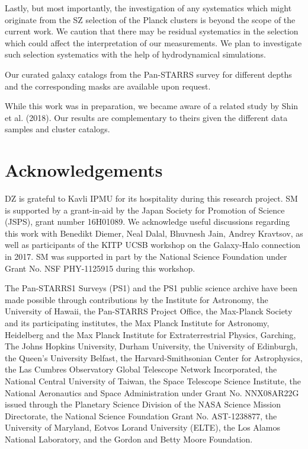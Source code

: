\documentclass[iop, apjl, twocolappendix, numberedappendix]{emulateapj}
\begin{document}
Lastly, but most importantly, the investigation of any systematics
which might originate from the SZ selection of the Planck clusters
is beyond the scope of the current work. We caution that there may
be residual systematics in the selection which could affect the
interpretation of our measurements. We plan to investigate such
selection systematics with the help of hydrodynamical simulations.

Our curated galaxy catalogs from the Pan-STARRS survey for different
depths and the corresponding masks are available upon request.

While this work was in preparation, we became aware of a related study
by Shin et al. (2018). Our results are complementary to theirs given
the different data samples and cluster catalogs.

\section*{Acknowledgements}
DZ is grateful to Kavli IPMU for its hospitality during this research
project. SM is supported by a grant-in-aid by the Japan Society for
Promotion of Science (JSPS), grant number 16H01089. We acknowledge
useful discussions regarding this work with Benedikt Diemer, Neal
Dalal, Bhuvnesh Jain, Andrey Kravtsov, as well as participants of the
KITP UCSB workshop on the Galaxy-Halo connection in 2017. SM was
supported in part by the National Science Foundation under Grant No.
NSF PHY-1125915 during this workshop.

The Pan-STARRS1 Surveys (PS1) and the PS1 public science archive
have been made possible through contributions by the Institute for
Astronomy, the University of Hawaii, the Pan-STARRS Project Office,
the Max-Planck Society and its participating institutes, the Max
Planck Institute for Astronomy, Heidelberg and the Max Planck
Institute for Extraterrestrial Physics, Garching, The Johns Hopkins
University, Durham University, the University of Edinburgh, the
Queen's University Belfast, the Harvard-Smithsonian Center for
Astrophysics, the Las Cumbres Observatory Global Telescope Network
Incorporated, the National Central University of Taiwan, the Space
Telescope Science Institute, the National Aeronautics and Space
Administration under Grant No. NNX08AR22G issued through the
Planetary Science Division of the NASA Science Mission Directorate,
the National Science Foundation Grant No. AST-1238877, the
University of Maryland, Eotvos Lorand University (ELTE), the Los
Alamos National Laboratory, and the Gordon and Betty Moore
Foundation.
\end{document}
